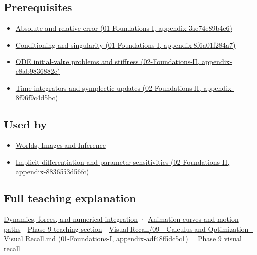\subsection{Prerequisites}\label{prerequisites}

\begin{itemize}
\tightlist
\item
  \href{}{Absolute and relative error (01-Foundations-I, appendix-3ae74e89b4e6)}
\item
  \href{}{Conditioning and singularity (01-Foundations-I, appendix-8f6a01f284a7)}
\item
  \href{}{ODE initial-value problems and stiffness (02-Foundations-II, appendix-e8ab9836882e)}
\item
  \href{}{Time integrators and symplectic updates (02-Foundations-II, appendix-8f96f9c4d5bc)}
\end{itemize}

\subsection{Used by}\label{used-by}

\begin{itemize}
\tightlist
\item
  \href{Continuous\%20Notes/University\%20-\%20Worlds,\%20Images\%20and\%20Inference\%20-\%20Graphics,\%20Vision\%20and\%20Photography}{Worlds, Images and Inference}
\item
  \href{}{Implicit differentiation and parameter sensitivities (02-Foundations-II, appendix-8836553d56fc)}
\end{itemize}

\subsection{Full teaching explanation}\label{full-teaching-explanation}

\href{Continuous\%20Notes/University\%20-\%20Worlds,\%20Images\%20and\%20Inference\%20-\%20Graphics,\%20Vision\%20and\%20Photography\#Dynamics,\%20forces,\%20and\%20numerical\%20integration}{Dynamics, forces, and numerical integration} · \href{Continuous\%20Notes/University\%20-\%20Worlds,\%20Images\%20and\%20Inference\%20-\%20Graphics,\%20Vision\%20and\%20Photography\#Animation\%20curves\%20and\%20motion\%20paths}{Animation curves and motion paths} - \href{Continuous\%20Notes/Computing\%20Foundations\%20-\%20From\%20Bits\%20to\%20C++\%20and\%20Systems\%20APIs\#ODEs\%20and\%20numerical\%20simulation}{Phase 9 teaching section} - \href{}{Visual Recall/09 - Calculus and Optimization - Visual Recall.md (01-Foundations-I, appendix-adf48f5dc5c1)} · Phase 9 visual recall
